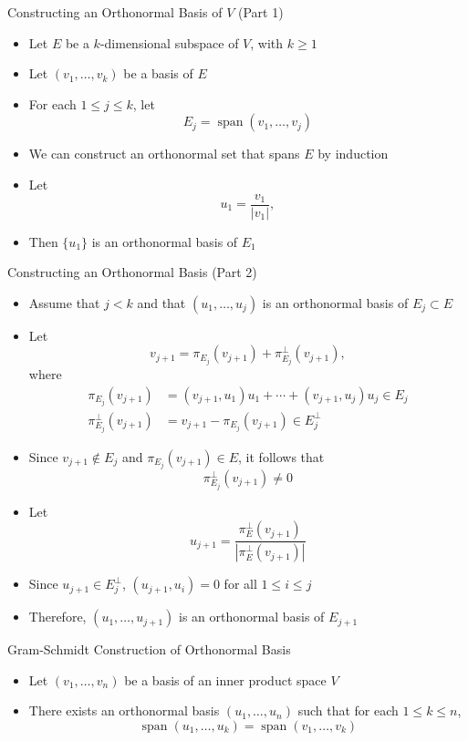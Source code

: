 \documentclass[usenames,dvipsnames,10pt]{beamer}
\newcommand\Span{\operatorname{span}}
\begin{document}
\begin{frame}
  {Constructing an Orthonormal Basis of $V$ (Part 1)}

  \begin{itemize}
  \item Let $E$ be a $k$-dimensional subspace of $V$, with $k \ge 1$
  \item Let $(v_1, \dots, v_k)$ be a basis of $E$
  \item For each $1 \le j \le k$, let
    \[
      E_j = \Span(v_1, \dots, v_j)
    \]
  \item We can construct an orthonormal set that spans $E$ by induction
  \item Let
    \[ u_1 = \frac{v_1}{|v_1|},
    \]
  \item Then $\{u_1\}$ is an orthonormal basis of $E_1$
  \end{itemize}
\end{frame}

\begin{frame}
  {Constructing an Orthonormal Basis (Part 2)}

  \begin{itemize}
  \item Assume that $j < k$ and that $(u_1, \dots, u_j)$ is an orthonormal basis of $E_j \subset E$
  \item Let
    \[
      v_{j+1} = \pi_{E_j}(v_{j+1}) + \pi_{E_j}^\perp(v_{j+1}),
    \]
    where
    \begin{align*}
      \pi_{E_j}(v_{j+1}) &= (v_{j+1},u_1)u_1 + \cdots + (v_{j+1},u_j)u_j \in E_j\\
      \pi_{E_j}^\perp(v_{j+1}) &= v_{j+1}-\pi_{E_j}(v_{j+1}) \in E_j^\perp
    \end{align*}
  \item Since $v_{j+1} \notin E_j$ and $\pi_{E_j}(v_{j+1}) \in E$, it follows that
    \[
      \pi_{E_j}^\perp(v_{j+1}) \ne 0
    \]
  \item Let
    \[
      u_{j+1} = \frac{\pi^\perp_E(v_{j+1})}{|\pi^\perp_E(v_{j+1})|}
    \]
  \item Since $u_{j+1} \in E_j^\perp$, $(u_{j+1},u_i) = 0$ for all $1 \le i \le j$
  \item Therefore, $(u_1, \dots, u_{j+1})$ is an orthonormal basis of $E_{j+1}$
  \end{itemize}
\end{frame}

\begin{frame}
  {Gram-Schmidt Construction of Orthonormal Basis}

  \begin{itemize}
  \item Let $(v_1, \dots, v_n)$ be a basis of an inner product space $V$
  \item There exists an orthonormal basis $(u_1, \dots, u_n)$ such that for each $1 \le k \le n$,
    \[
      \Span(u_1, \dots, u_k) = \Span(v_1, \dots, v_k)
    \]
  \end{itemize}
\end{frame}
\end{document}
